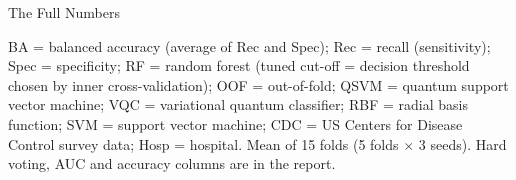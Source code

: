 \documentclass[aspectratio=169,10pt,t,xcolor={table,dvipsnames}]{beamer}
\begin{document}
\begin{frame}{The Full Numbers}
  \vfill
  {\tiny BA = balanced accuracy (average of Rec and Spec); Rec = recall (sensitivity); Spec = specificity; RF = random forest (tuned cut-off = decision threshold chosen by inner cross-validation); OOF = out-of-fold; QSVM = quantum support vector machine; VQC = variational quantum classifier; RBF = radial basis function; SVM = support vector machine; CDC = US Centers for Disease Control survey data; Hosp = hospital. Mean of 15 folds (5 folds $\times$ 3 seeds). Hard voting, AUC and accuracy columns are in the report.}
\end{frame}
\end{document}
